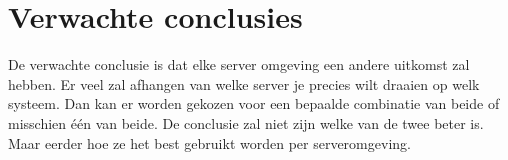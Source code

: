 \section{Verwachte conclusies}
\label{sec:verwachte_conclusies}
De verwachte conclusie is dat elke server omgeving een andere uitkomst zal hebben. Er veel zal afhangen van welke server je precies wilt draaien op welk systeem. Dan kan er worden gekozen voor een bepaalde combinatie van beide of misschien één van beide. De conclusie zal niet zijn welke van de twee beter is. Maar eerder hoe ze het best gebruikt worden per serveromgeving.




